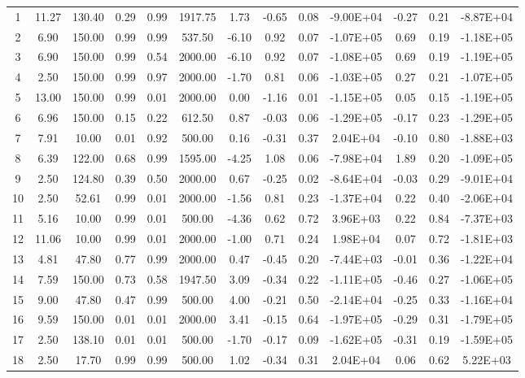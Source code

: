 \begin{landscape}
\begin{center}
\begin{longtable}{|c|c|c|c|c|c|c|c|c|c|c|c|c|}
1  & 11.27 & 130.40 & 0.29 & 0.99 & 1917.75 & 1.73  & -0.65 & 0.08 & -9.00E+04 & -0.27 & 0.21 & -8.87E+04 \\
2  & 6.90  & 150.00 & 0.99 & 0.99 & 537.50  & -6.10 & 0.92  & 0.07 & -1.07E+05 & 0.69  & 0.19 & -1.18E+05 \\
3  & 6.90  & 150.00 & 0.99 & 0.54 & 2000.00 & -6.10 & 0.92  & 0.07 & -1.08E+05 & 0.69  & 0.19 & -1.19E+05 \\
4  & 2.50  & 150.00 & 0.99 & 0.97 & 2000.00 & -1.70 & 0.81  & 0.06 & -1.03E+05 & 0.27  & 0.21 & -1.07E+05 \\
5  & 13.00 & 150.00 & 0.99 & 0.01 & 2000.00 & 0.00  & -1.16 & 0.01 & -1.15E+05 & 0.05  & 0.15 & -1.19E+05 \\
6  & 6.96  & 150.00 & 0.15 & 0.22 & 612.50  & 0.87  & -0.03 & 0.06 & -1.29E+05 & -0.17 & 0.23 & -1.29E+05 \\
7  & 7.91  & 10.00  & 0.01 & 0.92 & 500.00  & 0.16  & -0.31 & 0.37 & 2.04E+04  & -0.10 & 0.80 & -1.88E+03 \\
8  & 6.39  & 122.00 & 0.68 & 0.99 & 1595.00 & -4.25 & 1.08  & 0.06 & -7.98E+04 & 1.89  & 0.20 & -1.09E+05 \\
9  & 2.50  & 124.80 & 0.39 & 0.50 & 2000.00 & 0.67  & -0.25 & 0.02 & -8.64E+04 & -0.03 & 0.29 & -9.01E+04 \\
10 & 2.50  & 52.61  & 0.99 & 0.01 & 2000.00 & -1.56 & 0.81  & 0.23 & -1.37E+04 & 0.22  & 0.40 & -2.06E+04 \\
11 & 5.16  & 10.00  & 0.99 & 0.01 & 500.00  & -4.36 & 0.62  & 0.72 & 3.96E+03  & 0.22  & 0.84 & -7.37E+03 \\
12 & 11.06 & 10.00  & 0.99 & 0.01 & 2000.00 & -1.00 & 0.71  & 0.24 & 1.98E+04  & 0.07  & 0.72 & -1.81E+03 \\
13 & 4.81  & 47.80  & 0.77 & 0.99 & 2000.00 & 0.47  & -0.45 & 0.20 & -7.44E+03 & -0.01 & 0.36 & -1.22E+04 \\
14 & 7.59  & 150.00 & 0.73 & 0.58 & 1947.50 & 3.09  & -0.34 & 0.22 & -1.11E+05 & -0.46 & 0.27 & -1.06E+05 \\
15 & 9.00  & 47.80  & 0.47 & 0.99 & 500.00  & 4.00  & -0.21 & 0.50 & -2.14E+04 & -0.25 & 0.33 & -1.16E+04 \\
16 & 9.59  & 150.00 & 0.01 & 0.01 & 2000.00 & 3.41  & -0.15 & 0.64 & -1.97E+05 & -0.29 & 0.31 & -1.79E+05 \\
17 & 2.50  & 138.10 & 0.01 & 0.01 & 500.00  & -1.70 & -0.17 & 0.09 & -1.62E+05 & -0.31 & 0.19 & -1.59E+05 \\
18 & 2.50  & 17.70  & 0.99 & 0.99 & 500.00  & 1.02  & -0.34 & 0.31 & 2.04E+04  & 0.06  & 0.62 & 5.22E+03  \\

\end{longtable}
\end{center}
\end{landscape}
